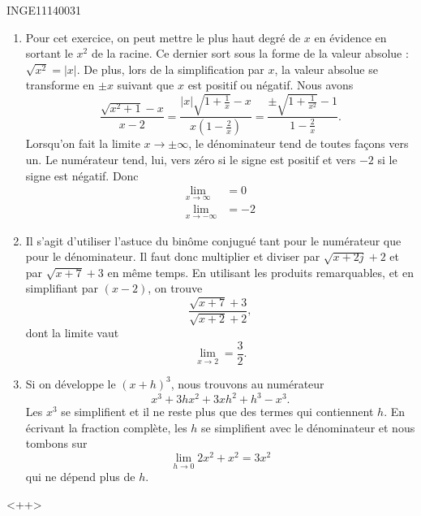 \documentclass{article}
\begin{document}
\begin{corrige}{INGE11140031}
\begin{enumerate}
		\item
			Pour cet exercice, on peut mettre le plus haut degré de $x$ en évidence en sortant le $x^2$ de la racine. Ce dernier sort sous la forme de la valeur absolue : $\sqrt{x^2}=| x |$. De plus, lors de la simplification par $x$, la valeur absolue se transforme en $\pm x$ suivant que $x$ est positif ou négatif. Nous avons
			\begin{equation}
				\frac{ \sqrt{x^2+1}-x }{ x-2 }=\frac{ | x |\sqrt{1+\frac{1}{ x }}-x }{ x(1-\frac{ 2 }{ x }) }=\frac{ \pm\sqrt{1+\frac{1}{ x^2 }}-1 }{ 1-\frac{ 2 }{ x } }.
			\end{equation}
			Lorsqu'on fait la limite $x\to \pm\infty$, le dénominateur tend de toutes façons vers un. Le numérateur tend, lui, vers zéro si le signe est positif et vers $-2$ si le signe est négatif. Donc
			\begin{subequations}
				\begin{align}
					\lim_{x\to \infty} &=0\\
					\lim_{x\to -\infty} &=-2
				\end{align}
			\end{subequations}

		\item
			Il s'agit d'utiliser l'astuce du binôme conjugué tant pour le numérateur que pour le dénominateur. Il faut donc multiplier et diviser par $\sqrt{x+2j}+2$ et par $\sqrt{x+7}+3$ en même temps. En utilisant les produits remarquables, et en simplifiant par $(x-2)$, on trouve
			\begin{equation}
				\frac{ \sqrt{x+7}+3 }{ \sqrt{x+2}+2 },
			\end{equation}
			dont la limite vaut 
			\begin{equation}
				\lim_{x\to 2} =\frac{ 3 }{ 2 }.
			\end{equation}

		\item
			Si on développe le $(x+h)^3$, nous trouvons au numérateur
			\begin{equation}
				x^3+3hx^2+3xh^2+h^3-x^3.
			\end{equation}
			Les $x^3$ se simplifient et il ne reste plus que des termes qui contiennent $h$. En écrivant la fraction complète, les $h$ se simplifient avec le dénominateur et nous tombons sur
			\begin{equation}
				\lim_{h\to 0} 2x^2+x^2=3x^2
			\end{equation}
			qui ne dépend plus de $h$.
			

	\end{enumerate}
	<++>

\end{corrige}
\end{document}

